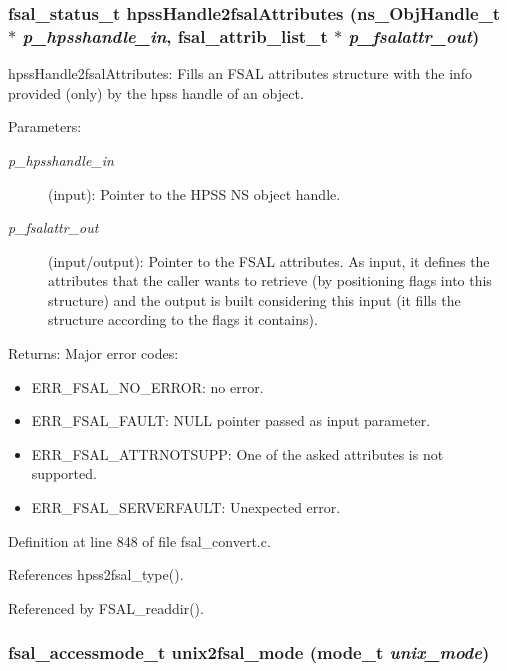 \subsubsection{\setlength{\rightskip}{0pt plus 5cm}fsal\_\-status\_\-t hpss\-Handle2fsal\-Attributes (ns\_\-Obj\-Handle\_\-t $\ast$ {\em p\_\-hpsshandle\_\-in}, fsal\_\-attrib\_\-list\_\-t $\ast$ {\em p\_\-fsalattr\_\-out})}\label{fsal__convert_8c_a15}


hpss\-Handle2fsal\-Attributes: Fills an FSAL attributes structure with the info provided (only) by the hpss handle of an object.

\begin{Desc}
\item[Parameters:]
\begin{description}
\item[{\em p\_\-hpsshandle\_\-in}](input): Pointer to the HPSS NS object handle. \item[{\em p\_\-fsalattr\_\-out}](input/output): Pointer to the FSAL attributes. As input, it defines the attributes that the caller wants to retrieve (by positioning flags into this structure) and the output is built considering this input (it fills the structure according to the flags it contains).\end{description}
\end{Desc}
\begin{Desc}
\item[Returns:]Major error codes:\begin{itemize}
\item ERR\_\-FSAL\_\-NO\_\-ERROR: no error.\item ERR\_\-FSAL\_\-FAULT: NULL pointer passed as input parameter.\item ERR\_\-FSAL\_\-ATTRNOTSUPP: One of the asked attributes is not supported.\item ERR\_\-FSAL\_\-SERVERFAULT: Unexpected error. \end{itemize}
\end{Desc}


Definition at line 848 of file fsal\_\-convert.c.

References hpss2fsal\_\-type().

Referenced by FSAL\_\-readdir().
\subsubsection{\setlength{\rightskip}{0pt plus 5cm}fsal\_\-accessmode\_\-t unix2fsal\_\-mode (mode\_\-t {\em unix\_\-mode})}\label{fsal__convert_8c_a6}


